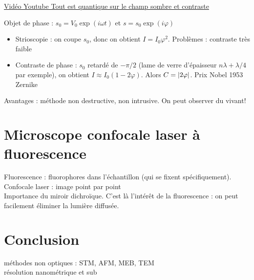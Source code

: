 \href{http://toutestquantique.fr/champ-sombre-et-contraste/}{Vidéo Youtube Tout est quantique sur le champ sombre et contraste}


Objet de phase : $s_0=V_0 \exp(i\omega t)$ et $s=s_0 \exp(i\varphi)$
\begin{itemize}
\item Strioscopie : on coupe $s_0$, donc on obtient $I=I_0 \varphi^2$. Problèmes : contraste très faible
\item Contraste de phase : $s_0$ retardé de $-\pi/2$ (lame de verre d’épaisseur $n\lambda+\lambda/4$ par exemple), on
obtient $I \approx I_0(1-2\varphi)$. Alors $C=\abs{2\varphi}$. Prix Nobel 1953 Zernike
\end{itemize}

Avantages : méthode non destructive, non intrusive. On peut observer du vivant!  \\


\section{Microscope confocale laser à fluorescence}
Fluorescence : fluorophores dans l’échantillon (qui se fixent spécifiquement).  \\
Confocale laser : image point par point \\
Importance du miroir dichroïque. C’est là l’intérêt de la fluorescence : on peut facilement éliminer la lumière diffusée. \\


\section*{Conclusion}
méthodes non optiques : STM, AFM, MEB, TEM \\
résolution nanométrique et sub


